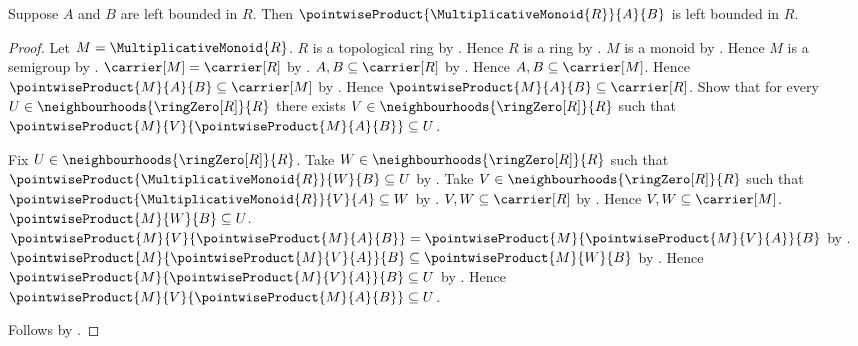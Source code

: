 \begin{theorem}\label{left_bounded_pointwise_product}
    Suppose $A$ and $B$ are left bounded in $R$.
    Then $\pointwiseProduct{\MultiplicativeMonoid{R}}{A}{B}$ is left bounded
        in $R$.
\end{theorem}
\begin{proof}
    Let $M=\MultiplicativeMonoid{R}$.
    $R$ is a topological ring by .
    Hence $R$ is a ring by .
    $M$ is a monoid by .
    Hence $M$ is a semigroup by .
    $\carrier[M]=\carrier[R]$ by .
    $A,B\subseteq\carrier[R]$ by .
    Hence $A,B\subseteq\carrier[M]$.
    Hence $\pointwiseProduct{M}{A}{B}\subseteq\carrier[M]$ by
        .
    Hence $\pointwiseProduct{M}{A}{B}\subseteq\carrier[R]$.
    Show that for every $U\in\neighbourhoods{\ringZero[R]}{R}$ there exists
        $V\in\neighbourhoods{\ringZero[R]}{R}$ such that
        $\pointwiseProduct{M}{V}{\pointwiseProduct{M}{A}{B}}\subseteq U$.
    \begin{subproof}
        Fix $U\in\neighbourhoods{\ringZero[R]}{R}$.
        Take $W\in\neighbourhoods{\ringZero[R]}{R}$ such that
            $\pointwiseProduct{\MultiplicativeMonoid{R}}{W}{B}\subseteq U$
            by .
        Take $V\in\neighbourhoods{\ringZero[R]}{R}$ such that
            $\pointwiseProduct{\MultiplicativeMonoid{R}}{V}{A}\subseteq W$
            by .
        $V,W\subseteq\carrier[R]$ by
            .
        Hence $V,W\subseteq\carrier[M]$.
        $\pointwiseProduct{M}{W}{B}\subseteq U$.
        $\pointwiseProduct{M}{V}{\pointwiseProduct{M}{A}{B}}
            =\pointwiseProduct{M}{\pointwiseProduct{M}{V}{A}}{B}$ by
            .
        $\pointwiseProduct{M}{\pointwiseProduct{M}{V}{A}}{B}
            \subseteq\pointwiseProduct{M}{W}{B}$ by
            .
        Hence $\pointwiseProduct{M}{\pointwiseProduct{M}{V}{A}}{B}
            \subseteq U$ by .
        Hence $\pointwiseProduct{M}{V}{\pointwiseProduct{M}{A}{B}}
            \subseteq U$.
    \end{subproof}
    Follows by .
\end{proof}

